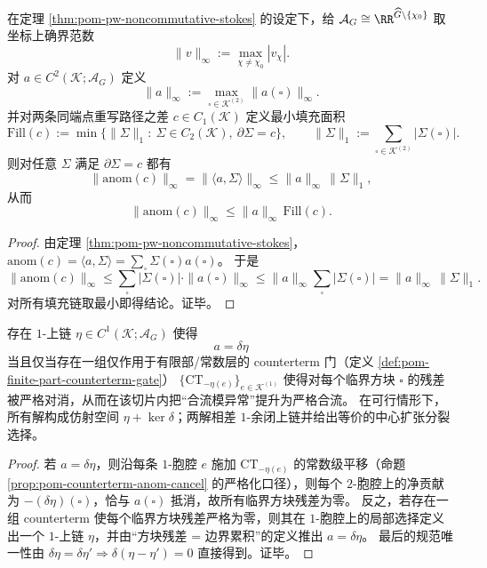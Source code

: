 \begin{corollary}[异常差的填充面积控制]\label{cor:pom-pw-holonomy-fill-linear-bound}
在定理 \ref{thm:pom-pw-noncommutative-stokes} 的设定下，给 \(\mathcal A_G\cong \RR^{\widehat G\setminus\{\chi_0\}}\) 取坐标上确界范数
\[
\|v\|_\infty:=\max_{\chi\neq\chi_0}|v_\chi|.
\]
对 \(a\in C^2(\mathcal K;\mathcal A_G)\) 定义
\[
\|a\|_\infty:=\max_{\square\in \mathcal K^{(2)}}\|a(\square)\|_\infty.
\]
并对两条同端点重写路径之差 \(c\in C_1(\mathcal K)\) 定义最小填充面积
\[
\mathrm{Fill}(c):=\min\bigl\{\|\Sigma\|_1:\ \Sigma\in C_2(\mathcal K),\ \partial\Sigma=c\bigr\},
\qquad
\|\Sigma\|_1:=\sum_{\square\in\mathcal K^{(2)}}|\Sigma(\square)|.
\]
则对任意 \(\Sigma\) 满足 \(\partial\Sigma=c\) 都有
\[
\|\mathrm{anom}(c)\|_\infty=\|\langle a,\Sigma\rangle\|_\infty\le \|a\|_\infty\,\|\Sigma\|_1,
\]
从而
\[
\boxed{\;\|\mathrm{anom}(c)\|_\infty\le \|a\|_\infty\,\mathrm{Fill}(c).\;}
\]
\end{corollary}
\begin{proof}
由定理 \ref{thm:pom-pw-noncommutative-stokes}，\(\mathrm{anom}(c)=\langle a,\Sigma\rangle=\sum_{\square}\Sigma(\square)a(\square)\)。
于是
\[
\|\mathrm{anom}(c)\|_\infty
\le \sum_{\square}|\Sigma(\square)|\cdot \|a(\square)\|_\infty
\le \|a\|_\infty\sum_{\square}|\Sigma(\square)|
=\|a\|_\infty\,\|\Sigma\|_1.
\]
对所有填充链取最小即得结论。证毕。
\end{proof}

\begin{theorem}\label{thm:pom-pw-counterterm-strictification-criterion}
存在 \(1\)-上链 \(\eta\in C^1(\mathcal K;\mathcal{A}_G)\) 使得
\[
\boxed{\;a=\delta\eta\;}
\]
当且仅当存在一组仅作用于有限部/常数层的 counterterm 门（定义 \ref{def:pom-finite-part-counterterm-gate}）
\(\{\mathrm{CT}_{-\eta(e)}\}_{e\in \mathcal K^{(1)}}\)
使得对每个临界方块 \(\square\) 的残差被严格对消，从而在该切片内把“合流模异常”提升为严格合流。
在可行情形下，所有解构成仿射空间 \(\eta+\ker\delta\)；两解相差 \(1\)-余闭上链并给出等价的中心扩张分裂选择。
\end{theorem}
\begin{proof}
若 \(a=\delta\eta\)，则沿每条 \(1\)-胞腔 \(e\) 施加 \(\mathrm{CT}_{-\eta(e)}\) 的常数级平移（命题 \ref{prop:pom-counterterm-anom-cancel} 的严格化口径），则每个 \(2\)-胞腔上的净贡献为 \(-(\delta\eta)(\square)\)，恰与 \(a(\square)\) 抵消，故所有临界方块残差为零。
反之，若存在一组 counterterm 使每个临界方块残差严格为零，则其在 \(1\)-胞腔上的局部选择定义出一个 \(1\)-上链 \(\eta\)，并由“方块残差 = 边界累积”的定义推出 \(a=\delta\eta\)。
最后的规范唯一性由 \(\delta\eta=\delta\eta'\Rightarrow \delta(\eta-\eta')=0\) 直接得到。证毕。
\end{proof}

